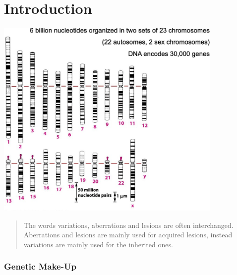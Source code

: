 \graphicspath{{chapters/ThebasicsImages/}}


\chapter{Introduction}

\includegraphics[width=4.32507in,height=3.86281in]{image1.jpeg}

\begin{quote}
The words variations, aberrations and lesions are often interchanged.
Aberrations and lesions are mainly used for acquired lesions, instead
variations are mainly used for the inherited ones.
\end{quote}

\hypertarget{genetic-make-up}{%
\subsection{Genetic Make-Up}\label{genetic-make-up}}

